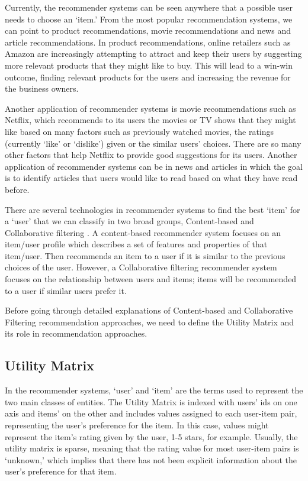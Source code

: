 Currently, the recommender systems can be seen anywhere that a possible user needs to choose an `item.' From the most popular recommendation systems, we can point to product recommendations, movie recommendations and news and article recommendations. In product recommendations, online retailers such as Amazon are increasingly attempting to attract and keep their users by suggesting more relevant products that they might like to buy. This will lead to a win-win outcome, finding relevant products for the users and increasing the revenue for the business owners. 

Another application of recommender systems is movie recommendations such as Netflix, which recommends to its users the movies or TV shows that they might like based on many factors such as previously watched movies, the ratings (currently `like' or `dislike') given or the similar users' choices. There are so many other factors that help Netflix to provide good suggestions for its users. Another application of recommender systems can be in news and articles in which the goal is to identify articles that users would like to read based on what they have read before.





There are several technologies in recommender systems to find the best `item' for a `user' that we can classify in two broad groups, Content-based and Collaborative ﬁltering \cite{rajaraman2011mining}. A content-based recommender system focuses on an item/user profile which describes a set of features and properties of that item/user. Then recommends an item to a user if it is similar to the previous choices of the user. However, a Collaborative filtering recommender system focuses on the relationship between users and items; items will be recommended to a user if similar users prefer it. 

Before going through detailed explanations of Content-based and Collaborative Filtering recommendation approaches, we need to define the Utility Matrix and its role in recommendation approaches. 
\subsection{Utility Matrix}
In the recommender systems, `user' and `item' are the terms used to represent the two main classes of entities.  The Utility Matrix is indexed with users' ids on one axis and items' on the other and includes values assigned to each user-item pair, representing the user's preference for the item. In this case, values might represent the item's rating given by the user, 1-5 stars, for example. Usually, the utility matrix is sparse, meaning that the rating value for most user-item pairs is `unknown,' which implies that there has not been explicit information about the user's preference for that item. 

